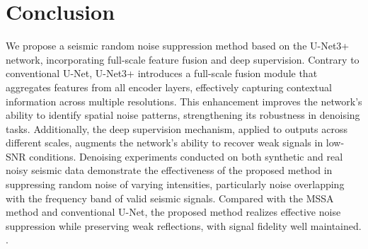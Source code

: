 \documentclass[preprint,12pt,authoryear]{elsarticle}
\begin{document}
\section{Conclusion}
\label{}
We propose a seismic random noise suppression method based on the U-Net3+ network, incorporating full-scale feature fusion and deep supervision. Contrary to conventional U-Net, U-Net3+ introduces a full-scale fusion module that aggregates features from all encoder layers, effectively capturing contextual information across multiple resolutions. This enhancement improves the network's ability to identify spatial noise patterns, strengthening its robustness in denoising tasks. Additionally, the deep supervision mechanism, applied to outputs across different scales, augments the network's ability to recover weak signals in low-SNR conditions. Denoising experiments conducted on both synthetic and real noisy seismic data demonstrate the effectiveness of the proposed method in suppressing random noise of varying intensities, particularly noise overlapping with the frequency band of valid seismic signals. Compared with the MSSA method and conventional U-Net, the proposed method realizes effective noise suppression while preserving weak reflections, with signal fidelity well maintained. .


 
 
\end{document}
